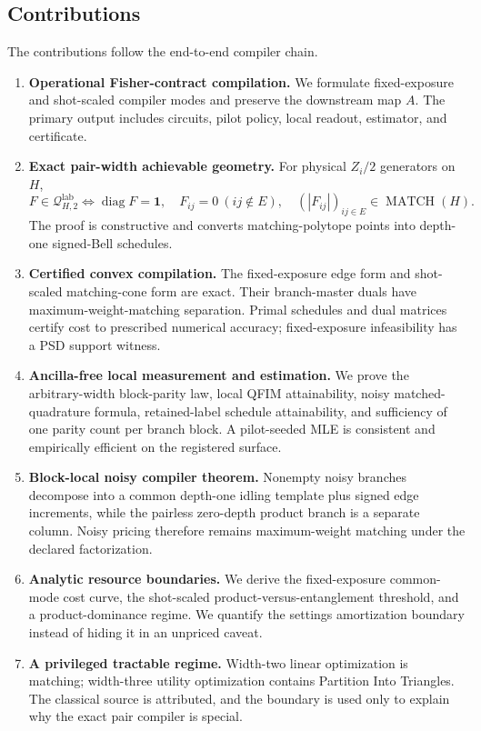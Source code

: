 \documentclass[11pt]{article}
\theoremstyle{definition}
\theoremstyle{remark}
\newcommand{\Q}{\mathcal{Q}}
\newcommand{\MATCH}{\operatorname{MATCH}}
\newcommand{\diag}{\operatorname{diag}}
\newcommand{\lab}{\mathrm{lab}}
\newcommand{\ones}{\mathbf{1}}
\begin{document}
\subsection{Contributions}
The contributions follow the end-to-end compiler chain.
\begin{enumerate}[label=\textbf{C\arabic*.}]
  \item \textbf{Operational Fisher-contract compilation.} We formulate fixed-exposure and shot-scaled compiler modes and preserve the downstream map $A$. The primary output includes circuits, pilot policy, local readout, estimator, and certificate.
  \item \textbf{Exact pair-width achievable geometry.} For physical $Z_i/2$ generators on $H$,
  \[
    F\in\Q^{\lab}_{H,2}
    \iff
    \diag F=\ones,\quad F_{ij}=0\ (ij\notin E),\quad
    (|F_{ij}|)_{ij\in E}\in\MATCH(H).
  \]
  The proof is constructive and converts matching-polytope points into depth-one signed-Bell schedules.
  \item \textbf{Certified convex compilation.} The fixed-exposure edge form and shot-scaled matching-cone form are exact. Their branch-master duals have maximum-weight-matching separation. Primal schedules and dual matrices certify cost to prescribed numerical accuracy; fixed-exposure infeasibility has a PSD support witness.
  \item \textbf{Ancilla-free local measurement and estimation.} We prove the arbitrary-width block-parity law, local QFIM attainability, noisy matched-quadrature formula, retained-label schedule attainability, and sufficiency of one parity count per branch block. A pilot-seeded MLE is consistent and empirically efficient on the registered surface.
  \item \textbf{Block-local noisy compiler theorem.} Nonempty noisy branches decompose into a common depth-one idling template plus signed edge increments, while the pairless zero-depth product branch is a separate column. Noisy pricing therefore remains maximum-weight matching under the declared factorization.
  \item \textbf{Analytic resource boundaries.} We derive the fixed-exposure common-mode cost curve, the shot-scaled product-versus-entanglement threshold, and a product-dominance regime. We quantify the settings amortization boundary instead of hiding it in an unpriced caveat.
  \item \textbf{A privileged tractable regime.} Width-two linear optimization is matching; width-three utility optimization contains Partition Into Triangles. The classical source is attributed, and the boundary is used only to explain why the exact pair compiler is special.

\end{enumerate}
\end{document}

